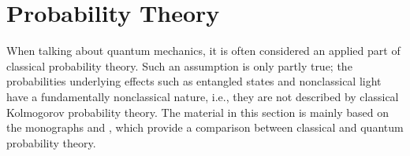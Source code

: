 \chapter{Probability Theory}
When talking about quantum mechanics, it is often considered
an applied part of classical probability theory. Such an assumption
is only partly true; the probabilities underlying effects such as
entangled states and nonclassical light have a fundamentally
nonclassical nature, i.e., they are not described by classical
Kolmogorov probability theory. The material in this section is mainly
based on the monographs \cite{bHolevo2003} and \cite{bHolevo2003add}, which provide a 
comparison between classical and quantum probability theory.



